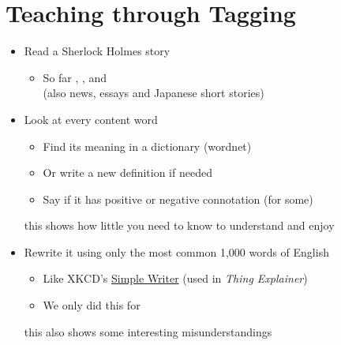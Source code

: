 \documentclass[a4paper,landscape,headrule,footrule,xetex]{foils}
\begin{document}
\section{Teaching through Tagging}


\begin{itemize}\addtolength{\itemsep}{-1ex}
\item Read a Sherlock Holmes story
  \begin{itemize}
  \item  So far , ,  and 
\\ (also news, essays and Japanese short stories)
  \end{itemize}
\item Look at every content word
  \begin{itemize}
  \item Find its meaning in a dictionary (wordnet)
  \item Or write a new definition if needed
  \item Say if it has positive or negative connotation (for some)
  \end{itemize}
  this shows how little you need to know to understand and enjoy
\item Rewrite it using only the most common 1,000 words of English
  \begin{itemize}
  \item Like XKCD's \href{https://xkcd.com/simplewriter/}{Simple Writer}
    (used in \textit{Thing Explainer})
  \item We only did this for 
  \end{itemize}
  this also shows some interesting misunderstandings
\end{itemize}



\end{document}
